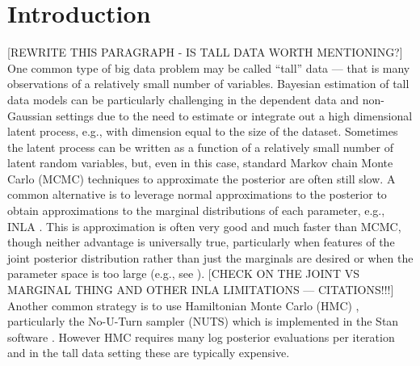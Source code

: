 \documentclass[12pt]{article}
\begin{document}
\section{Introduction}

[REWRITE THIS PARAGRAPH - IS TALL DATA WORTH MENTIONING?]
One common type of big data problem may be called ``tall'' data --- that is many observations of a relatively small number of variables. Bayesian estimation of tall data models can be particularly challenging in the dependent data and non-Gaussian settings due to the need to estimate or integrate out a high dimensional latent process, e.g., with dimension equal to the size of the dataset. Sometimes the latent process can be written as a function of a relatively small number of latent random variables, but, even in this case, standard Markov chain Monte Carlo (MCMC) techniques to approximate the posterior are often still slow. A common alternative is to leverage normal approximations to the posterior to obtain approximations to the marginal distributions of each parameter, e.g., INLA \citep{rue2009approximate}. This is approximation is often very good and much faster than MCMC, though neither advantage is universally true, particularly when features of the joint posterior distribution rather than just the marginals are desired or when the parameter space is too large (e.g., see \citet{taylor2014inla}). [CHECK ON THE JOINT VS MARGINAL THING AND OTHER INLA LIMITATIONS --- CITATIONS!!!] Another common strategy is to use Hamiltonian Monte Carlo (HMC) \citep{neal2011mcmc}, particularly the No-U-Turn sampler (NUTS) \citep{homan2014no} which is implemented in the Stan software \citep{carpenter2015stan}. However HMC requires many log posterior evaluations per iteration and in the tall data setting these are typically expensive.
\end{document}
